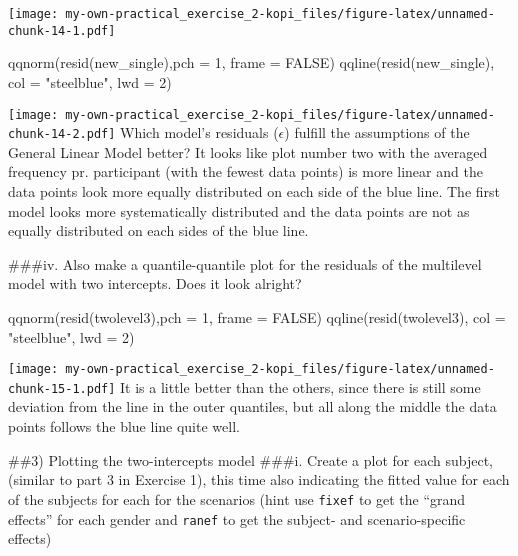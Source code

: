 \documentclass[
]{article}
\newenvironment{Shaded}{\begin{snugshade}}{\end{snugshade}}
\newcommand{\AttributeTok}[1]{\textcolor[rgb]{0.77,0.63,0.00}{#1}}
\newcommand{\ConstantTok}[1]{\textcolor[rgb]{0.00,0.00,0.00}{#1}}
\newcommand{\DecValTok}[1]{\textcolor[rgb]{0.00,0.00,0.81}{#1}}
\newcommand{\FunctionTok}[1]{\textcolor[rgb]{0.00,0.00,0.00}{#1}}
\newcommand{\NormalTok}[1]{#1}
\newcommand{\StringTok}[1]{\textcolor[rgb]{0.31,0.60,0.02}{#1}}
\begin{document}
\texttt{[image: my-own-practical\_exercise\_2-kopi\_files/figure-latex/unnamed-chunk-14-1.pdf]}

\begin{Shaded}
\begin{Highlighting}[]
\FunctionTok{qqnorm}\NormalTok{(}\FunctionTok{resid}\NormalTok{(new\_single),}\AttributeTok{pch =} \DecValTok{1}\NormalTok{, }\AttributeTok{frame =} \ConstantTok{FALSE}\NormalTok{)}
\FunctionTok{qqline}\NormalTok{(}\FunctionTok{resid}\NormalTok{(new\_single), }\AttributeTok{col =} \StringTok{"steelblue"}\NormalTok{, }\AttributeTok{lwd =} \DecValTok{2}\NormalTok{)}
\end{Highlighting}
\end{Shaded}

\texttt{[image: my-own-practical\_exercise\_2-kopi\_files/figure-latex/unnamed-chunk-14-2.pdf]}
Which model's residuals (\(\epsilon\)) fulfill the assumptions of the
General Linear Model better? It looks like plot number two with the
averaged frequency pr. participant (with the fewest data points) is more
linear and the data points look more equally distributed on each side of
the blue line. The first model looks more systematically distributed and
the data points are not as equally distributed on each sides of the blue
line.

\#\#\#iv. Also make a quantile-quantile plot for the residuals of the
multilevel model with two intercepts. Does it look alright?

\begin{Shaded}
\begin{Highlighting}[]
\FunctionTok{qqnorm}\NormalTok{(}\FunctionTok{resid}\NormalTok{(twolevel3),}\AttributeTok{pch =} \DecValTok{1}\NormalTok{, }\AttributeTok{frame =} \ConstantTok{FALSE}\NormalTok{)}
\FunctionTok{qqline}\NormalTok{(}\FunctionTok{resid}\NormalTok{(twolevel3), }\AttributeTok{col =} \StringTok{"steelblue"}\NormalTok{, }\AttributeTok{lwd =} \DecValTok{2}\NormalTok{)}
\end{Highlighting}
\end{Shaded}

\texttt{[image: my-own-practical\_exercise\_2-kopi\_files/figure-latex/unnamed-chunk-15-1.pdf]}
It is a little better than the others, since there is still some
deviation from the line in the outer quantiles, but all along the middle
the data points follows the blue line quite well.

\#\#3) Plotting the two-intercepts model \#\#\#i. Create a plot for each
subject, (similar to part 3 in Exercise 1), this time also indicating
the fitted value for each of the subjects for each for the scenarios
(hint use \texttt{fixef} to get the ``grand effects'' for each gender
and \texttt{ranef} to get the subject- and scenario-specific effects)
\end{document}
